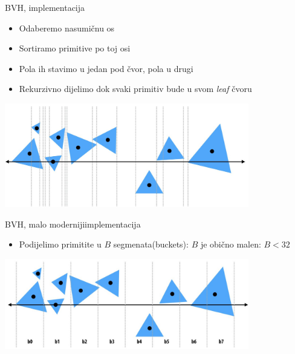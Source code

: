 \documentclass[9pt]{beamer}
\begin{document}
\begin{frame}{BVH, implementacija}
	\begin{itemize}
		\item Odaberemo nasumičnu os
		\item Sortiramo primitive po toj osi
		\item Pola ih stavimo u jedan pod čvor, pola u drugi
		\item Rekurzivno dijelimo dok svaki primitiv bude u svom \textit{leaf} čvoru
	\end{itemize}
	\begin{center}
		\includegraphics[width=0.8\textwidth]{slike/slide_032.jpg}
	\end{center}
\end{frame}

\begin{frame}{BVH, malo modernijiimplementacija}
	\begin{itemize}
		\item Podijelimo primitite u $B$ segmenata(buckets): $B$ je obično malen: $B<32$
	\end{itemize}
	\begin{center}
		\includegraphics[width=0.8\textwidth]{slike/slide_033.jpg}
	\end{center}
\end{frame}
\end{document}
